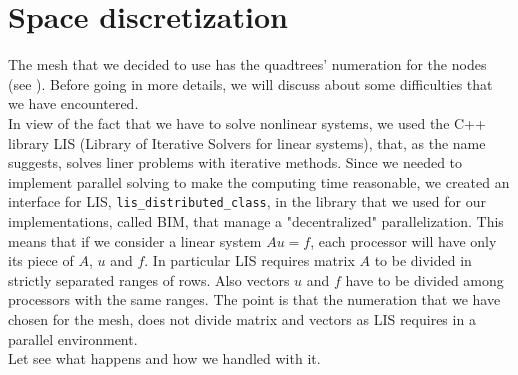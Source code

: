 \section{Space discretization}
The mesh that we decided to use has the quadtrees' numeration for the nodes (see \cite{p4est}). Before going in more details, we will discuss about some difficulties that we have encountered. \\
In view of the fact that we have to solve nonlinear systems, we used the C++ library LIS (Library of Iterative Solvers for linear systems), that, as the name suggests, solves liner problems with iterative methods. Since we needed to implement parallel solving to make the computing time reasonable, we created an interface for LIS, \texttt{lis\_distributed\_class}, in the library that we used for our implementations, called BIM, that manage a "decentralized" parallelization. This means that if we consider a linear system $ A u = f $, each processor will have  only its piece of $ A $, $ u $ and $ f $. In particular LIS requires matrix $ A $ to be divided in strictly separated ranges of rows. Also vectors $ u $ and $ f $ have to be divided among processors with the same ranges. The point is that the numeration that we have chosen for the mesh, does not divide matrix and vectors as LIS requires in a parallel environment. \\
Let see what happens and how we handled with it.
